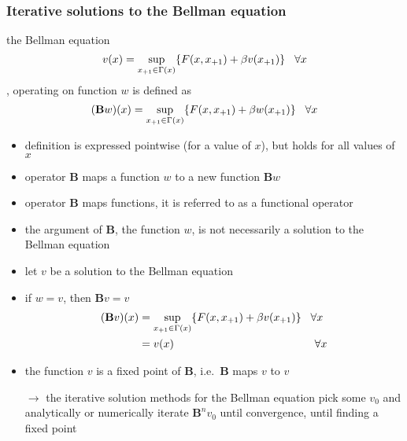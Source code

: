 \documentclass[compress,aspectratio=169]{beamer}
\begin{document}
\begin{frame}
\frametitle{Iterative solutions to the Bellman equation}
the Bellman equation
\begin{displaymath}
v(x)=\sup_{x_{+1}\in \Gamma(x)} \{F(x,x_{+1})+\beta v(x_{+1}) \} \hspace{3 mm} \forall x
\end{displaymath}
{\color{red!70!white}{the Bellman operator}}, operating on function $w$ is defined as
\begin{displaymath}
(\mathbf B w)(x)=\sup_{x_{+1}\in \Gamma(x)} \{F(x,x_{+1})+\beta w(x_{+1}) \} \hspace{3 mm} \forall x
\end{displaymath}
\begin{itemize}
\item definition is expressed pointwise (for a value of $x$), but holds for all values of $x$
\item operator $\mathbf B$ maps a function $w$ to a new function $\mathbf Bw$
\item operator $\mathbf B$ maps functions, it is referred to as a functional operator
\item the argument of $\mathbf B$, the function $w$, is not necessarily a solution to the Bellman equation
\end{itemize}
\end{frame}

\begin{frame}
\begin{itemize}
\item let $v$ be a solution to the Bellman equation
\item if $w=v$, then $\mathbf Bv=v$
\begin{align*}
(\mathbf Bv)(x) & = \sup_{x_{+1}\in \Gamma(x)} \{F(x,x_{+1})+\beta v(x_{+1}) \} \hspace{3 mm} \forall x \\
& = v(x) \hspace{45 mm} \forall x \\
\end{align*}
\item the function $v$ is a fixed point of $\mathbf B$, i.e.\ $\mathbf B$ maps $v$ to $v$
\vspace{3 mm}
\item[$\rightarrow$] the iterative solution methods for the Bellman equation pick some $v_0$ and analytically or numerically iterate $\mathbf B^nv_0$ until convergence, until finding a fixed point
\end{itemize}
\end{frame}
\end{document}
